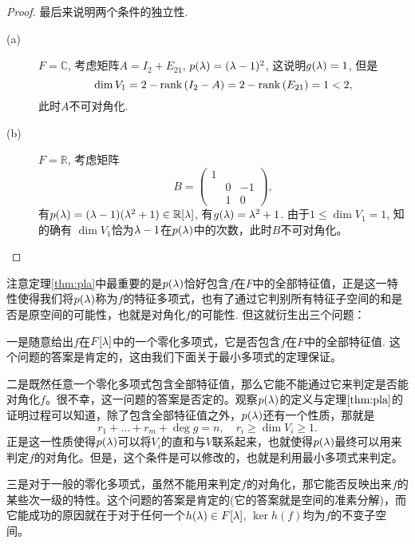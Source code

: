 \begin{proof}
	最后来说明两个条件的独立性.
	\begin{description}
		\item[(a)] $F=\mathbb{C}$, 考虑矩阵$A=I_2+E_{21}$, $p(\lambda)=(\lambda-1)^2$, 这说明$g(\lambda)=1$, 但是
		\[\dim V_1=2-\operatorname*{rank\,}(I_2-A)=2-\operatorname*{rank\,}(E_{21})=1<2,\]
		此时$A$不可对角化.
		\item[(b)] $F=\mathbb{R}$, 考虑矩阵
		\[B=\begin{pmatrix}
		  1 & &\\
		  &0&-1\\
		  &1&0\end{pmatrix},\]
		有$p(\lambda)=(\lambda-1)(\lambda^2+1)\in \mathbb{R}[\lambda]$, 有$g(\lambda)=\lambda^2+1$. 由于$1\leq \dim V_1=1$, 知的确有
		$\dim V_1$恰为$\lambda-1$在$p(\lambda)$中的次数，此时$B$不可对角化。
	\end{description}
\end{proof}
注意定理\ref{thm:pla}中最重要的是$p(\lambda)$恰好包含$f$在$F$中的全部特征值，正是这一特性使得我们将$p(\lambda)$称为$f$的特征多项式，也有了通过它判别所有特征子空间的和是否是原空间的可能性，也就是对角化$f$的可能性. 但这就衍生出三个问题：

一是随意给出$f$在$F[\lambda]$中的一个零化多项式，它是否包含$f$在$F$中的全部特征值. 这个问题的答案是肯定的，这由我们下面关于最小多项式的定理保证。

二是既然任意一个零化多项式包含全部特征值，那么它能不能通过它来判定是否能对角化$f$。很不幸，这一问题的答案是否定的。观察$p(\lambda)$的定义与定理$\ref{thm:pla}$的证明过程可以知道，除了包含全部特征值之外，$p(\lambda)$还有一个性质，那就是
\[r_1+\dots+r_m+\deg g=n,\quad r_i\geq \dim V_i\geq 1.\]
正是这一性质使得$p(\lambda)$可以将$V_i$的直和与$V$联系起来，也就使得$p(\lambda)$最终可以用来判定$f$的对角化。但是，这个条件是可以修改的，也就是利用最小多项式来判定。

三是对于一般的零化多项式，虽然不能用来判定$f$的对角化，那它能否反映出来$f$的某些次一级的特性。这个问题的答案是肯定的(它的答案就是空间的准素分解)，而它能成功的原因就在于对于任何一个$h(\lambda)\in F[\lambda]$, $\ker h(f)$均为$f$的不变子空间。

